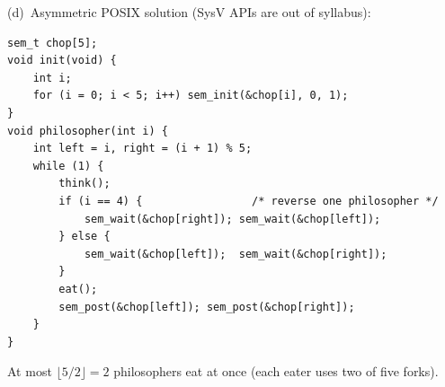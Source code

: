 \documentclass[11pt,a4paper]{article}
\newenvironment{Sol}{%
  \begin{tcolorbox}[sboxstyle, title={Solution}]%
}{%
  \end{tcolorbox}\vspace{0.35em}%
}
\begin{document}
\begin{Sol}
(d)~Asymmetric POSIX solution (SysV APIs are out of syllabus):
\begin{lstlisting}[numbers=none]
sem_t chop[5];
void init(void) {
    int i;
    for (i = 0; i < 5; i++) sem_init(&chop[i], 0, 1);
}
void philosopher(int i) {
    int left = i, right = (i + 1) % 5;
    while (1) {
        think();
        if (i == 4) {                 /* reverse one philosopher */
            sem_wait(&chop[right]); sem_wait(&chop[left]);
        } else {
            sem_wait(&chop[left]);  sem_wait(&chop[right]);
        }
        eat();
        sem_post(&chop[left]); sem_post(&chop[right]);
    }
}
\end{lstlisting}
At most $\lfloor 5/2 \rfloor = 2$ philosophers eat at once (each eater
uses two of five forks).
\end{Sol}
\end{document}

